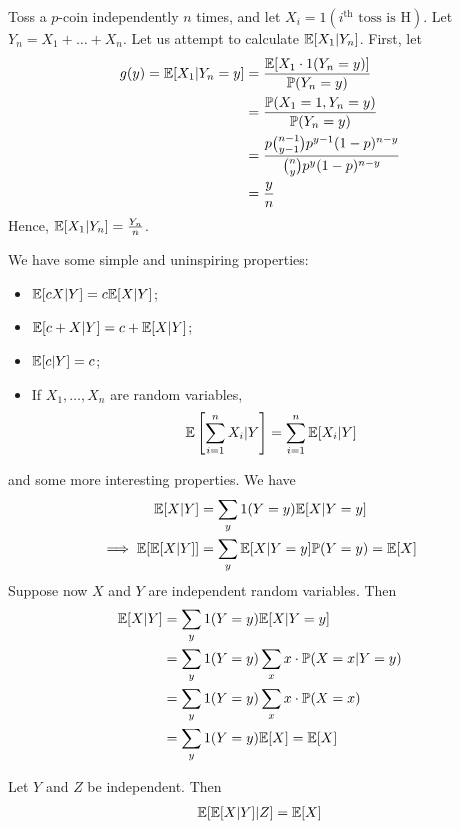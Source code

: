 \documentclass{../../template/note}
\begin{document}
    \begin{example*}
        Toss a \(p\)-coin independently \(n\) times, and let \(X_i = 1(i^\text{th} \text{ toss is H})\). Let \(Y_n = X_1 + \dots + X_n\). Let us attempt to calculate \(\mathbb E[X_1 | Y_n]\). First, let
        \begin{align*}
            g(y) = \mathbb E[X_1 | Y_n = y] &= \frac{\mathbb E[X_1 \cdot 1(Y_n=y)]}{\mathbb P(Y_n=y)} \\
            &= \frac{\mathbb P(X_1 = 1, Y_n = y)}{\mathbb P(Y_n=y)} \\
            &= \frac{p \binom{n-1}{y-1} p^{y-1} (1-p)^{n-y}}{\binom{n}{y} p^y (1-p)^{n-y}} \\
            &= \frac{y}{n}
        \end{align*}
        Hence, \(\mathbb E[X_1 | Y_n] = \frac{Y_n}{n}\).        
    \end{example*}
    We have some simple and uninspiring properties:
    \begin{itemize}
        \item \(\mathbb E[cX | Y] = c\mathbb E[X | Y]\);
        \item \(\mathbb E[c + X | Y] = c + \mathbb E[X | Y]\);
        \item \(\mathbb E[c | Y] = c\);
        \item If \(X_1, \dots, X_n\) are random variables,
        \begin{align*}
            \mathbb E\left[\sum_{i=1}^n X_i | Y\right] = \sum_{i=1}^n \mathbb E[X_i | Y]
        \end{align*}
    \end{itemize}
    and some more interesting properties. We have
    \begin{align*}
        \mathbb E[X | Y] &= \sum_y 1(Y = y) \mathbb E[X | Y = y] \\
        \implies \mathbb E[\mathbb E[X | Y]] &= \sum_y \mathbb E[X | Y = y]\mathbb P(Y = y)= \mathbb E[X]
    \end{align*}
    Suppose now \(X\) and \(Y\) are independent random variables. Then
    \begin{align*}
        \mathbb E[X | Y] &= \sum_y 1(Y = y) \mathbb E[X | Y = y] \\
        &= \sum_y 1(Y = y) \sum_x x \cdot \mathbb P(X = x | Y = y) \\
        &= \sum_y 1(Y = y) \sum_x x \cdot \mathbb P(X = x) \\
        &= \sum_y 1(Y = y) \mathbb E[X] = \mathbb E[X]
    \end{align*}
    
    \begin{proposition}
        Let \(Y\) and \(Z\) be independent. Then
        \begin{align*}
            \mathbb E[\mathbb E[X | Y] | Z] = \mathbb E[X]
        \end{align*}
    \end{proposition}
    
\end{document}
